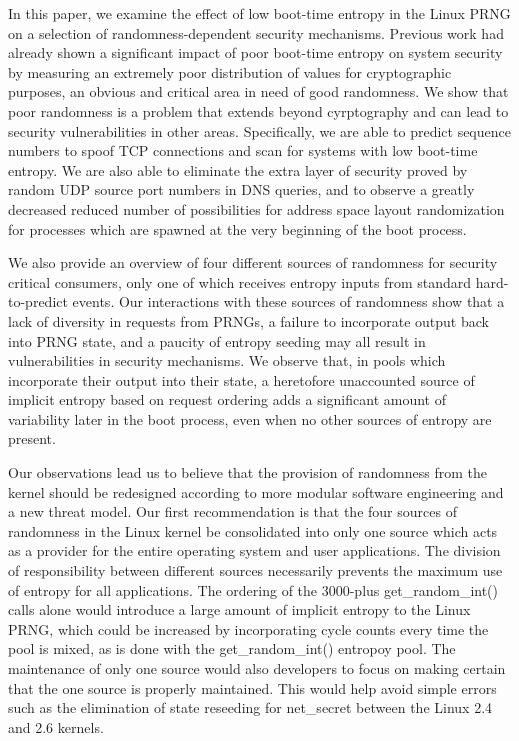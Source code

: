 In this paper, we examine the effect of low boot-time entropy in the Linux PRNG on a selection of randomness-dependent security mechanisms.  Previous work had already shown a significant impact of poor boot-time entropy on system security by measuring an extremely poor distribution of values for cryptographic purposes, an obvious and critical area in need of good randomness.  We show that poor randomness is a problem that extends beyond cyrptography and can lead to security vulnerabilities in other areas.  Specifically, we are able to predict sequence numbers to spoof TCP connections and scan for systems with low boot-time entropy.  We are also able to eliminate the extra layer of security proved by random UDP source port numbers in DNS queries, and to observe a greatly decreased reduced number of possibilities for address space layout randomization for processes which are spawned at the very beginning of the boot process.

We also provide an overview of four different sources of randomness for security critical consumers, only one of which receives entropy inputs from standard hard-to-predict events.  Our interactions with these sources of randomness show that a lack of diversity in requests from PRNGs, a failure to incorporate output back into PRNG state, and a paucity of entropy seeding may all result in vulnerabilities in security mechanisms.  We observe that, in pools which incorporate their output into their state, a heretofore unaccounted source of implicit entropy based on request ordering adds a significant amount of variability later in the boot process, even when no other sources of entropy are present.  

Our observations lead us to believe that the provision of randomness from the kernel should be redesigned according to more modular software engineering and a new threat model.  Our first recommendation is that the four sources of randomness in the Linux kernel be consolidated into only one source which acts as a provider for the entire operating system and user applications.  The division of responsibility between different sources necessarily prevents the maximum use of entropy for all applications.  The ordering of the 3000-plus get\_random\_int() calls alone would introduce a large amount of implicit entropy to the Linux PRNG, which could be increased by incorporating cycle counts every time the pool is mixed, as is done with the get\_random\_int() entropoy pool.  The maintenance of only one source would also developers to focus on making certain that the one source is properly maintained.  This would help avoid simple errors such as the elimination of state reseeding for net\_secret between the Linux 2.4 and 2.6 kernels. 

